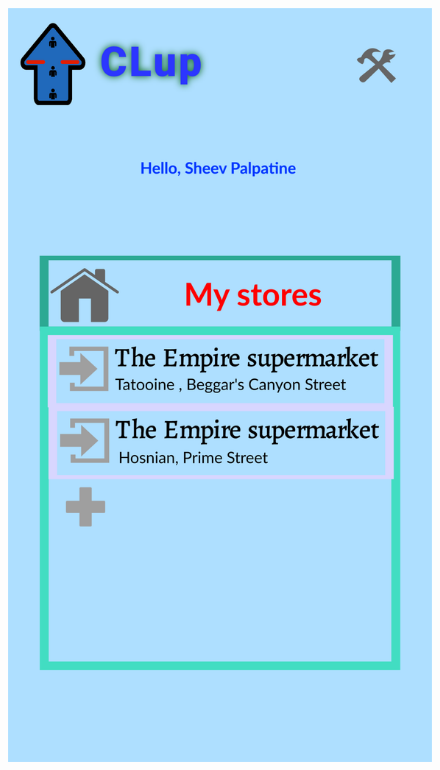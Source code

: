 \begin{itemize}
\begin{itemize}
	\end{itemize}
	\begin{figure}[!htb]
		\centering
		\includegraphics[scale=0.1]{Images/MainMenuOwner.png}
		\qquad \qquad

\end{figure}
\end{itemize}
